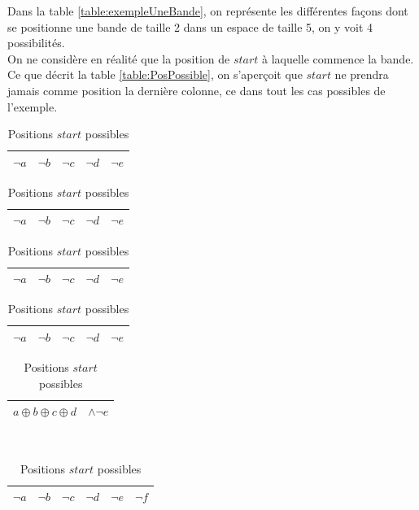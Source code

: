 \documentclass[a4paper,12pt]{report}
\newcommand\black{\cellcolor{black}}
\newcommand\grey{\cellcolor{black!50}}
\begin{document}
Dans la table \ref{table:exempleUneBande}, on représente les différentes façons dont se positionne une bande de taille 2 dans un espace de taille 5, on y voit 4 possibilités.\\
On ne considère en réalité que la position de $start$ à laquelle commence la bande. Ce que décrit la table \ref{table:PosPossible}, on s'aperçoit que $start$ ne prendra jamais comme position la dernière colonne, ce dans tout les cas possibles de l'exemple. 

\begin{table}[H]
        \begin{subtable}[B]{0.5\textwidth}
        \centering
			\begin{tabular}{|c|c|c|c||c|}
			\hline 
			\color{white}$\lnot$\color{black}$a$ & $\lnot b$ & $\lnot c$  & $\lnot d$ & $\lnot e$ \\ 
			\hline
			\end{tabular}
			
			\begin{tabular}{|c|c|c|c||c|}
			\hline 
			$\lnot a$ & \color{white}$\lnot$\color{black}$b$ & $\lnot c$  & $\lnot d$ & $\lnot e$ \\ 
			\hline
			\end{tabular}
			
			\begin{tabular}{|c|c|c|c||c|}
			\hline 
			$\lnot a$ & $\lnot b$ & \color{white}$\lnot$\color{black}$c$  & $\lnot d$ & $\lnot e$ \\ 
			\hline
			\end{tabular}

			\begin{tabular}{|c|c|c|c||c|}
			\hline 
			$\lnot a$ & $\lnot b$ & $\lnot c$  & \color{white}$\lnot$\color{black}$d$ & $\lnot e$ \\ 
			\hline
			\end{tabular}

			\begin{tabular}{|c c c c c|}
			\hline 
			\multicolumn{4}{|c||}{$a \oplus b \oplus c \oplus d$} & $\wedge \lnot e$ \\ 
			\hline
			\end{tabular}			
        \caption{Positions $start$ possibles}
        \label{table:posXor}
    \end{subtable}
    ~
	    \begin{subtable}[B]{0.5\textwidth}
        \centering
			\begin{tabular}{|c|c|c|c||c|c|}
			\hline 
			\grey \color{gray}$\lnot$\color{white}$a$ & \black \color{white}$\lnot b$ &
			\black \color{white}$\lnot c$  & $\lnot d$ & $\lnot e$ & $\lnot f$\\ 
			\hline
			\end{tabular}
			

\end{subtable}
\end{table}
\end{document}
